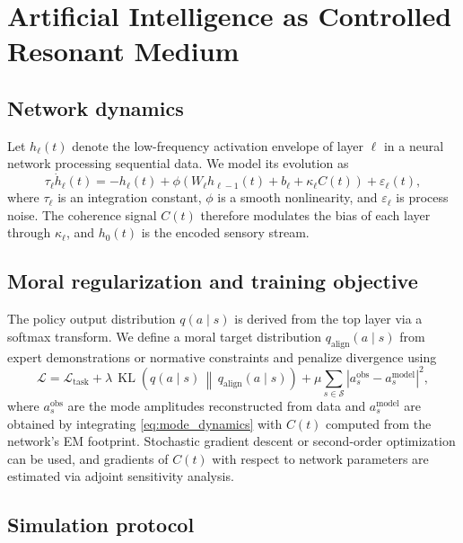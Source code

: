 \documentclass[12pt,a4paper]{article}
\theoremstyle{definition}
\begin{document}
\section{Artificial Intelligence as Controlled Resonant Medium}

\subsection{Network dynamics}

Let $h_\ell(t)$ denote the low-frequency activation envelope of layer $\ell$ in a neural network processing sequential data. We model its evolution as
\begin{equation}
\label{eq:ai_layer_dynamics}
\tau_\ell \dot{h}_\ell(t) = -h_\ell(t) + \phi\!\left(W_\ell h_{\ell-1}(t) + b_\ell + \kappa_\ell C(t) \right) + \varepsilon_\ell(t),
\end{equation}
where $\tau_\ell$ is an integration constant, $\phi$ is a smooth nonlinearity, and $\varepsilon_\ell$ is process noise. The coherence signal $C(t)$ therefore modulates the bias of each layer through $\kappa_\ell$, and $h_0(t)$ is the encoded sensory stream.

\subsection{Moral regularization and training objective}

The policy output distribution $q(a \mid s)$ is derived from the top layer via a softmax transform. We define a moral target distribution $q_{\text{align}}(a \mid s)$ from expert demonstrations or normative constraints and penalize divergence using
\begin{equation}
\label{eq:ai_loss}
\mathcal{L} = \mathcal{L}_{\text{task}} + \lambda \, \operatorname{KL}\!\left(q(a \mid s) \,\middle\|\, q_{\text{align}}(a \mid s)\right) + \mu \sum_{s \in \mathcal{S}} \left|a_s^{\text{obs}} - a_s^{\text{model}}\right|^2,
\end{equation}
where $a_s^{\text{obs}}$ are the mode amplitudes reconstructed from data and $a_s^{\text{model}}$ are obtained by integrating \eqref{eq:mode_dynamics} with $C(t)$ computed from the network's EM footprint. Stochastic gradient descent or second-order optimization can be used, and gradients of $C(t)$ with respect to network parameters are estimated via adjoint sensitivity analysis.

\subsection{Simulation protocol}
\end{document}
